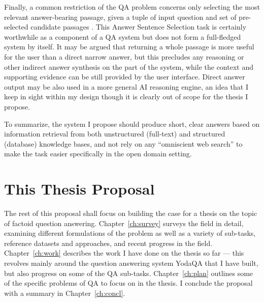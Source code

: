 Finally, a common restriction of the QA problem concerns only selecting
the most relevant answer-bearing passage, given a tuple of input question
and set of pre-selected candidate passages \citep{WangQAGrammar}.
This Answer Sentence Selection task is certainly
worthwhile as a component of a QA system but does not form a full-fledged
system by itself.
It may be argued that returning a whole passage is more useful for the user than a direct narrow answer,
but this precludes any reasoning or other indirect answer synthesis on the part of the system,
while the context and supporting evidence can be still provided by the user interface.
Direct answer output may be also used in a more general AI reasoning engine,
an idea that I keep in sight within my design though it is clearly
out of scope for the thesis I propose.

To summarize, the system I propose should produce short, clear answers
based on information retrieval from both
unstructured (full-text) and structured (database) knowledge bases,
and not rely on any ``omniscient web search'' to make the task easier
specifically in the open domain setting.

\section{This Thesis Proposal}

The rest of this proposal shall focus on building the case for
a thesis on the topic of factoid question answering.
Chapter~\ref{ch:survey}
surveys the field in detail, examining different formulations of the problem
as well as a variety of sub-tasks, reference datasets and approaches,
and recent progress in the field.
Chapter~\ref{ch:work} describes
the work I have done on the thesis so far --- this revolves mainly around
the question answering system YodaQA that I have built, but also progress
on some of the QA sub-tasks.
Chapter~\ref{ch:plan} outlines some of the specific problems of QA
to focus on in the thesis.
I conclude the proposal with a summary in Chapter~\ref{ch:concl}.
